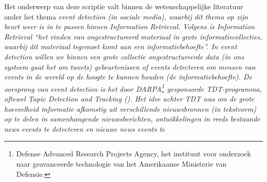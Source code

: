 Het onderwerp van deze scriptie valt binnen de wetenschappelijke literatuur 
onder het thema \it{event detection} (in sociale media), waarbij dit thema op zijn beurt weer is in te 
passen binnen \it{Information Retrieval}. Volgens \citet{manning2008introduction} is Information 
Retrieval \it{“het vinden van ongestructureerd materiaal in grote 
informatiecollecties, waarbij dit materiaal tegemoet komt aan een 
informatiebehoefte”}. In event detection willen we binnen een grote collectie 
ongestructureerde data (in ons systeem gaat het om tweets) 
gebeurtenissen of \it{events} detecteren om mensen van events in de wereld op de 
hoogte te kunnen houden (de informatiebehoefte). 
\vl
De oorsprong van event detection is het door DARPA\footnote{Defense Advanced Research Projects Agency, het instituut voor onderzoek naar geavanceerde technologie van het Amerikaanse Ministerie van Defensie.} gesponsorde TDT-programma, 
oftewel \it{Topic Detection and Tracking} (\citealt{atefeh2013survey}). Het idee achter TDT was om 
de grote hoeveelheid informatie afkomstig uit verschillende 
nieuwsbronnen (in tekstvorm) op te delen in samenhangende nieuwsberichten, ontwikkelingen in 
reeds bestaande \it{news events} te detecteren en nieuwe news events te 
